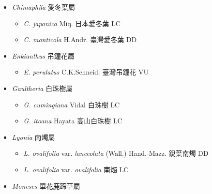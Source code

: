 
  \begin{itemize}
 \item[] \textit{Chimaphila} 愛冬葉屬
                                
  \begin{itemize}
        \item[] \textit{C. japonica} Miq.  日本愛冬葉   LC
        \item[] \textit{C. monticola} H.Andr.  臺灣愛冬葉   DD
  \end{itemize}
 \item[] \textit{Enkianthus} 吊鐘花屬
                                
  \begin{itemize}
        \item[] \textit{E. perulatus} C.K.Schneid.  臺灣吊鐘花   VU
  \end{itemize}
 \item[] \textit{Gaultheria} 白珠樹屬
                                
  \begin{itemize}
        \item[] \textit{G. cumingiana} Vidal  白珠樹   LC
        \item[] \textit{G. itoana} Hayata  高山白珠樹   LC
  \end{itemize}
 \item[] \textit{Lyonia} 南燭屬
                                
  \begin{itemize}
        \item[] \textit{L. ovalifolia} var. \textit{lanceolata} (Wall.) Hand.-Mazz.  銳葉南燭   DD
        \item[] \textit{L. ovalifolia} var. \textit{ovalifolia}   南燭   LC
  \end{itemize}
 \item[] \textit{Moneses} 單花鹿蹄草屬
                                

\end{itemize}
